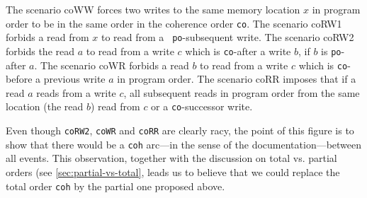 \documentclass[a4paper]{article}
\begin{document}
The scenario \textsf{coWW} forces two writes to the same memory location $x$ in
program order to be in the same order in the coherence order {\tt co}. The
scenario \textsf{coRW1} forbids a read from $x$ to read from a {\tt
po}-subsequent write.  The scenario \textsf{coRW2} forbids the read $a$ to read
from a write $c$ which is {\tt co}-after a write $b$, if $b$ is {\tt po}-after
$a$. The scenario \textsf{coWR} forbids a read $b$ to read from a write $c$
which is {\tt co}-before a previous write $a$ in program order. The scenario
\textsf{coRR} imposes that if a read $a$ reads from a write $c$, all subsequent
reads in program order from the same location (\eg the read $b$) read from $c$
or a {\tt co}-successor write.

{\color{blue} Even though {\tt coRW2}, {\tt coWR} and {\tt coRR} are clearly
racy, the point of this figure is to show that there would be a {\tt coh}
arc---in the sense of the documentation---between all events. This observation,
together with the discussion on total vs. partial orders (see
\mysec\ref{sec:partial-vs-total}, leads us to believe that we could replace the
total order {\tt coh} by the partial one proposed above.}


%
\end{document}

